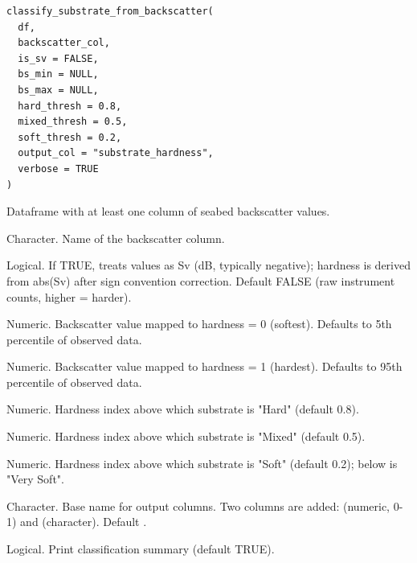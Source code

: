 \documentclass[a4paper]{book}
\begin{document}
%
\begin{Usage}
\begin{verbatim}
classify_substrate_from_backscatter(
  df,
  backscatter_col,
  is_sv = FALSE,
  bs_min = NULL,
  bs_max = NULL,
  hard_thresh = 0.8,
  mixed_thresh = 0.5,
  soft_thresh = 0.2,
  output_col = "substrate_hardness",
  verbose = TRUE
)
\end{verbatim}
\end{Usage}
%
\begin{Arguments}
\begin{ldescription}
\item[\code{df}] Dataframe with at least one column of seabed backscatter values.

\item[\code{backscatter\_col}] Character. Name of the backscatter column.

\item[\code{is\_sv}] Logical. If TRUE, treats values as Sv (dB, typically negative);
hardness is derived from abs(Sv) after sign convention correction.
Default FALSE (raw instrument counts, higher = harder).

\item[\code{bs\_min}] Numeric. Backscatter value mapped to hardness = 0 (softest).
Defaults to 5th percentile of observed data.

\item[\code{bs\_max}] Numeric. Backscatter value mapped to hardness = 1 (hardest).
Defaults to 95th percentile of observed data.

\item[\code{hard\_thresh}] Numeric. Hardness index above which substrate is "Hard"
(default 0.8).

\item[\code{mixed\_thresh}] Numeric. Hardness index above which substrate is "Mixed"
(default 0.5).

\item[\code{soft\_thresh}] Numeric. Hardness index above which substrate is "Soft"
(default 0.2); below is "Very Soft".

\item[\code{output\_col}] Character. Base name for output columns. Two columns are
added:  (numeric, 0-1) and 
(character). Default .

\item[\code{verbose}] Logical. Print classification summary (default TRUE).
\end{ldescription}
\end{Arguments}
\end{document}
